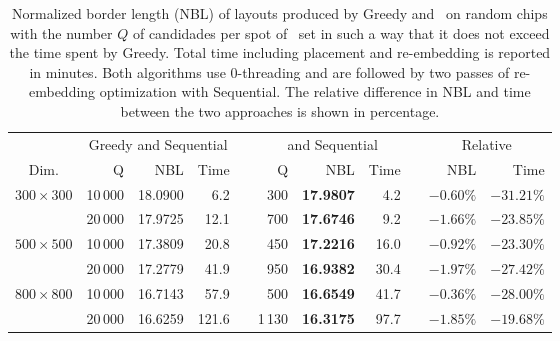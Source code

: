 \begin{table}[t!]\centering
\caption{\label{tab:greedycomp_bl}
  Normalized border length (NBL) of layouts produced by Greedy and \Greedyplus\
  on random chips with the number $Q$ of candidades per spot of \Greedyplus\ set
  in such a way that it does not exceed the time spent by Greedy. Total time
  including placement and re-embedding is reported in minutes. Both algorithms
  use $0$-threading and are followed by two passes of re-embedding optimization
  with Sequential. The relative difference in NBL and time between the two
  approaches is shown in percentage.}
\footnotesize{
\begin{tabular}{crrrlrrrlrr}
\vspace{1pt}
                & \multicolumn{3}{c}{Greedy and Sequential} & & \multicolumn{3}{c}{\Greedyplus\ and Sequential} & & \multicolumn{2}{c}{Relative} \\ \cline{2-4} \cline{6-8} \cline{10-11}
\vspace{1pt}
Dim.            & Q       & NBL     & Time  & & Q      & NBL     & Time & & NBL       & Time \\
\hline
$300\times 300$ & 10\,000 & 18.0900 &   6.2 & &    300 & {\bf 17.9807} &  4.2 & & $-0.60\%$ & $-31.21\%$ \\
                & 20\,000 & 17.9725 &  12.1 & &    700 & {\bf 17.6746} &  9.2 & & $-1.66\%$ & $-23.85\%$ \\
\hline
$500\times 500$ & 10\,000 & 17.3809 &  20.8 & &    450 & {\bf 17.2216} & 16.0 & & $-0.92\%$ & $-23.30\%$ \\
                & 20\,000 & 17.2779 &  41.9 & &    950 & {\bf 16.9382} & 30.4 & & $-1.97\%$ & $-27.42\%$ \\
\hline
$800\times 800$ & 10\,000 & 16.7143 &  57.9 & &    500 & {\bf 16.6549} & 41.7 & & $-0.36\%$ & $-28.00\%$ \\
                & 20\,000 & 16.6259 & 121.6 & & 1\,130 & {\bf 16.3175} & 97.7 & & $-1.85\%$ & $-19.68\%$ \\
\hline
\end{tabular}}
\end{table}

